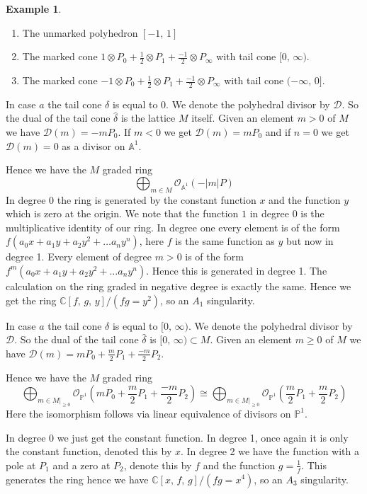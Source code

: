\documentclass[12pt,a4paper]{book}      %
\theoremstyle{definition}
\newtheorem{ex}[thm]{Example}
\begin{document}
\begin{ex}
\begin{enumerate}[label =\alph*)]
\item The unmarked polyhedron $[-1, \, 1]$
\item The marked cone $1\otimes P_0 + \frac{1}{2} \otimes P_1 + \frac{-1}{2} \otimes P_\infty$ with tail cone $[0,\, \infty)$.
\item The marked cone $-1\otimes P_0 + \frac{1}{2} \otimes P_1 + \frac{-1}{2} \otimes P_\infty$ with tail cone $(-\infty, \, 0]$.
\end{enumerate}

In case $a$ the tail cone $\delta$ is equal to $0$. We denote the polyhedral divisor by $\mathcal{D}$. So the dual of the tail cone $\hat{\delta}$ is the lattice $M$ itself. Given an element $ m >0$ of $M$ we have $\mathcal{D}(m) = -mP_0$. If $m <0$ we get $\mathcal{D}(m) = mP_0$ and if $n=0$ we get $\mathcal{D}(m) = 0$ as a divisor on $\mathbb{A}^1$. 

Hence we have the $M$ graded ring
\[
\bigoplus_{m \in M} \mathcal{O}_{\mathbb{A}^1}(-|m|P)
\]
In degree 0 the ring is generated by the constant function $x$ and the function $y$ which is zero at the origin. We note that the function $1$ in degree 0 is the multiplicative identity of our ring. In degree one every element is of the form $f ( a_0 x + a_1 y + a_2 y^2 + \dots  a_n y^n)$, here $f$ is the same function as $y$ but now in degree 1. Every element of degree $m>0$ is of the form $f^m ( a_0 x + a_1 y + a_2 y^2 + \dots  a_n y^n)$. Hence this is generated in degree 1. The calculation on the ring graded in negative degree is exactly the same.  Hence we get the ring $\mathbb{C}[f,  \, g, \, y]/ (fg=y^2)$, so an $A_1$ singularity.


In case $a$ the tail cone $\delta$ is equal to $[0 ,  \, \infty)$. We denote the polyhedral divisor by $\mathcal{D}$. So the dual of the tail cone $\hat{\delta}$ is $[0 ,  \, \infty) \subset M$. Given an element $ m \geq 0$ of $M$ we have $\mathcal{D}(m) = mP_0 +\frac{m}{2} P_1 + \frac{-m}{2}P_2$. 

Hence we have the $M$ graded ring
\[
\bigoplus_{m \in M|_{\geq 0}} \mathcal{O}_{\mathbb{P}^1} \left(mP_0 +\frac{m}{2} P_1 + \frac{-m}{2}P_2 \right) \cong \bigoplus_{m \in M|_{\geq 0}} \mathcal{O}_{\mathbb{P}^1} \left(\frac{m}{2} P_1 + \frac{m}{2}P_2 \right)
\]
Here the isomorphism follows via linear equivalence of divisors on $\mathbb{P}^1$.

In degree 0 we just get the constant function. In degree 1, once again it is only the constant function, denoted this by $x$. In degree 2 we have the function with a pole at $P_1$ and a zero at $P_2$, denote this by $f$ and the function $g = \frac{1}{f}$. This generates the ring hence we have $\mathbb{C}[x, \, f, \, g]/(fg = x^4)$, so an $A_3$ singularity.



\end{ex}
\end{document}
